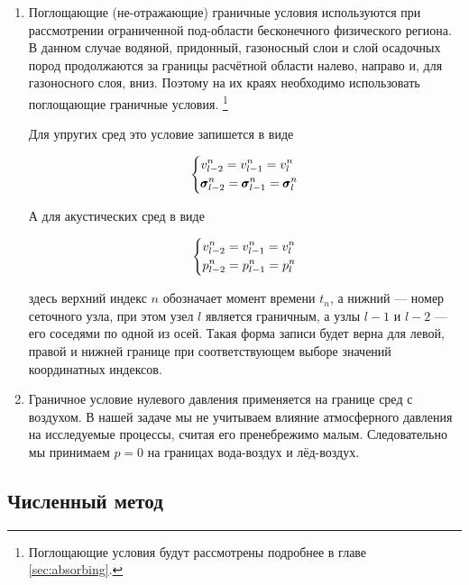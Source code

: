 \begin{enumerate}
    \item Поглощающие (не-отражающие) граничные условия используются при рассмотрении ограниченной под-области бесконечного физического региона. В данном случае водяной, придонный, газоносный слои и слой осадочных пород продолжаются за границы расчётной области налево, направо и, для газоносного слоя, вниз. Поэтому на их краях необходимо использовать поглощающие граничные условия. \footnote{Поглощающие условия будут рассмотрены подробнее в главе \ref{sec:absorbing}.}
    
    Для упругих сред это условие запишется в виде
    
    \begin{equation}
    \begin{dcases}
        v_{l-2}^n = 
        v_{l-1}^n = 
        v_{l}^n \\
        \pmb{\sigma}_{l-2}^n = 
        \pmb{\sigma}_{l-1}^n = 
        \pmb{\sigma}_{l}^n
    \end{dcases}
    \end{equation}
    
    А для акустических сред в виде
    
    \begin{equation}
    \begin{dcases}
        v_{l-2}^n = 
        v_{l-1}^n = 
        v_{l}^n \\
        p_{l-2}^n = 
        p_{l-1}^n = 
        p_{l}^n
    \end{dcases}
    \end{equation}
    
    здесь верхний индекс $n$ обозначает момент времени $t_n$, а нижний --- номер сеточного узла, при этом узел $l$ является граничным, а узлы $l-1$ и $l-2$ --- его соседями по одной из осей. Такая форма записи будет верна для левой, правой и нижней границе при соответствующем выборе значений координатных индексов.
    
    \item Граничное условие нулевого давления применяется на границе сред с воздухом. В нашей задаче мы не учитываем влияние атмосферного давления на исследуемые процессы, считая его пренебрежимо малым. Следовательно мы принимаем $p=0$ на границах вода-воздух и лёд-воздух.
\end{enumerate}

\subsection{Численный метод}

